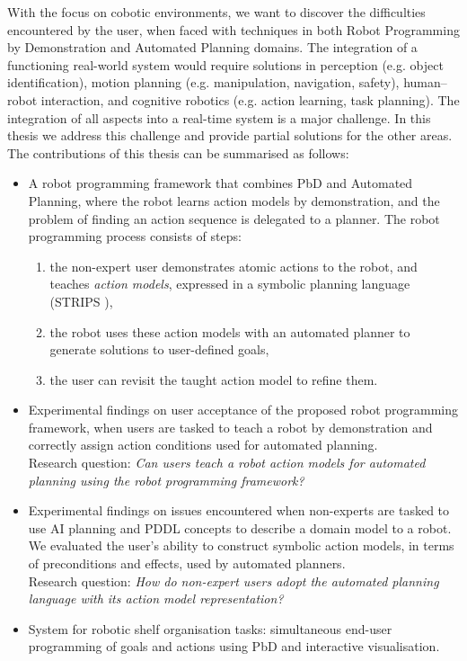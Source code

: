 With the focus on cobotic environments, we want to discover the difficulties encountered by the user, when faced with techniques in both Robot Programming by Demonstration and Automated Planning domains. 
The integration of a functioning real-world system would require solutions in perception (e.g. object identification), motion planning (e.g. manipulation, navigation, safety), human–robot interaction, and cognitive robotics (e.g. action learning, task planning). 
The integration of all aspects into a real-time system is a major challenge.
In this thesis we address this challenge and provide partial solutions for the other areas.
The contributions of this thesis can be summarised as follows:
\begin{itemize}
	\item {A robot programming framework that combines PbD and Automated Planning, where the robot learns action models by demonstration, and the problem of finding an action sequence is delegated to a planner.
	The robot programming process consists of steps:
	\begin{enumerate}
		\item the non-expert user demonstrates atomic actions to the robot, and teaches \textit{action models}, expressed in a symbolic planning language (STRIPS \cite{fikes1971strips}),
		\item the robot uses these action models with an automated planner to generate solutions to user-defined goals,
		\item the user can revisit the taught action model to refine them.
	\end{enumerate}}
    \item {Experimental findings on user acceptance of the proposed robot programming framework, when users are tasked to teach a robot by demonstration and correctly assign action conditions used for automated planning. \\
    Research question: \textit{Can users teach a robot action models for automated planning using the robot programming framework?}}
    \item {Experimental findings on issues encountered when non-experts are tasked to use AI planning and PDDL concepts to describe a domain model to a robot. 
    	We evaluated the user's ability to construct symbolic action models, in terms of preconditions and effects, used by automated planners.\\ 
    Research question: \textit{How do non-expert users adopt the automated planning language with its action model representation?}}
    \item {System for robotic shelf organisation tasks: simultaneous end-user programming of goals and actions using PbD and interactive visualisation. }
\end{itemize}
